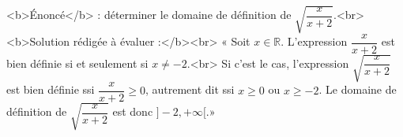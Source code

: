 <b>Énoncé</b> : déterminer le domaine de définition de $\sqrt{\dfrac{x}{x+2}}$.<br> <b>Solution rédigée à évaluer :</b><br>  « Soit $x\in\mathbb{R}$. L'expression $\dfrac{x}{x+2}$ est bien définie si et seulement si $x\neq -2$.<br> Si c'est le cas, l'expression $\sqrt{\dfrac{x}{x+2}}$ est bien définie ssi $\dfrac{x}{x+2}\geq 0$, autrement dit ssi $x\geq 0$ ou $x\geq -2$. Le domaine de définition de $\sqrt{\dfrac{x}{x+2}}$ est donc $]-2,+\infty[$.»

\begin{reponses}
\end{reponses}

\begin{comment}
Par exemple, si $x=-1$, on voit que $\dfrac{x}{x+2}< 0$.
\end{comment}

